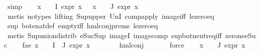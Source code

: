 \begin{isabellebody}
\ simp\isanewline
\ \ \isamarkupfalse%
\ {\isachardoublequoteopen}{\isasymforall}x\ {\isasymin}\ {\isasymPhi}\ {\isacharbackquote}{\kern0pt}\ I{\isachardot}{\kern0pt}\ expr{\isacharunderscore}{\kern0pt}{}\ x\ {\isasymle}\ {}{\isachardoublequoteclose}\ {\isachardoublequoteopen}{\isasymforall}x\ {\isasymin}\ {\isasymPhi}\ {\isacharbackquote}{\kern0pt}\ J{\isachardot}{\kern0pt}\ expr{\isacharunderscore}{\kern0pt}{}\ x\ {\isasymle}\ {}{\isachardoublequoteclose}\isanewline
\ \ \ \ \ \isamarkupfalse%
\ {\isacharparenleft}{\kern0pt}metis\ {\isacharparenleft}{\kern0pt}no{\isacharunderscore}{\kern0pt}types{\isacharcomma}{\kern0pt}\ lifting{\isacharparenright}{\kern0pt}\ Sup{\isacharunderscore}{\kern0pt}upper\ UnI{}\ comp{\isacharunderscore}{\kern0pt}apply\ image{\isacharunderscore}{\kern0pt}iff\ le{\isacharunderscore}{\kern0pt}zero{\isacharunderscore}{\kern0pt}eq{\isacharparenright}{\kern0pt}\isanewline
\ \ \ \ \isamarkupfalse%
\ sup\ bot{\isacharunderscore}{\kern0pt}enat{\isacharunderscore}{\kern0pt}def\ empty{\isacharunderscore}{\kern0pt}iff\ hml{\isacharunderscore}{\kern0pt}conj{\isachardot}{\kern0pt}prems\ le{\isacharunderscore}{\kern0pt}zero{\isacharunderscore}{\kern0pt}eq\isanewline
\ \ \ \ \isamarkupfalse%
\ {\isacharparenleft}{\kern0pt}metis\ Sup{\isacharunderscore}{\kern0pt}union{\isacharunderscore}{\kern0pt}distrib\ eSuc{\isacharunderscore}{\kern0pt}Sup\ imageI\ image{\isacharunderscore}{\kern0pt}comp\ sup{\isacharunderscore}{\kern0pt}bot{\isachardot}{\kern0pt}neutr{\isacharunderscore}{\kern0pt}eq{\isacharunderscore}{\kern0pt}iff\ zero{\isacharunderscore}{\kern0pt}ne{\isacharunderscore}{\kern0pt}eSuc{\isacharparenright}{\kern0pt}\isanewline
\ \ \isamarkupfalse%
\ fa{\isacharunderscore}{\kern0pt}e{}{\isacharcolon}{\kern0pt}\ {\isachardoublequoteopen}{\isasymforall}x\ {\isasymin}\ {\isasymPhi}\ {\isacharbackquote}{\kern0pt}\ {\isacharparenleft}{\kern0pt}I\ {\isasymunion}\ J{\isacharparenright}{\kern0pt}{\isachardot}{\kern0pt}\ expr{\isacharunderscore}{\kern0pt}{}\ x\ {\isasymle}\ {}{\isachardoublequoteclose}\isanewline
\ \ \ \ \isamarkupfalse%
\ hml{\isacharunderscore}{\kern0pt}conj\ \isanewline
\ \ \ \ \isamarkupfalse%
\ force\isanewline
\ \ \isamarkupfalse%
\ {\isachardoublequoteopen}{\isasymforall}x\ {\isasymin}\ {\isasymPhi}\ {\isacharbackquote}{\kern0pt}\ J{\isachardot}{\kern0pt}\ expr{\isacharunderscore}{\kern0pt}{}\ x\ {\isasymle}\ {}{\isachardoublequoteclose}\isanewline

\end{isabellebody}

